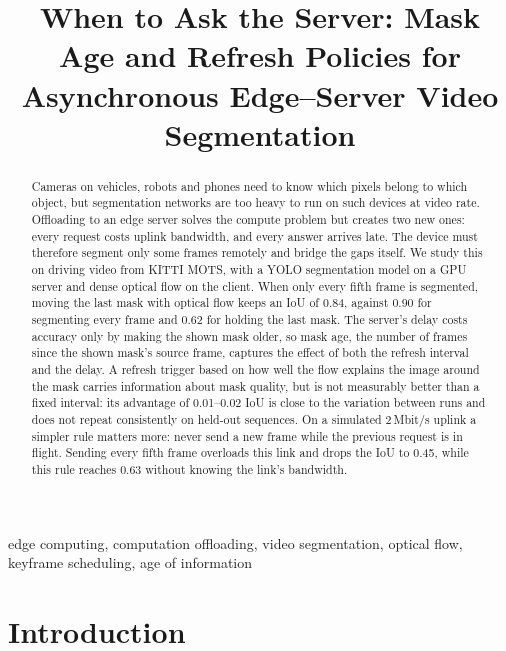 \documentclass[conference]{IEEEtran}
\newcommand{\todo}[1]{\textcolor{red}{[TODO: #1]}}
\begin{document}
\title{When to Ask the Server: Mask Age and Refresh Policies for Asynchronous Edge--Server Video Segmentation}

\author{
\IEEEauthorblockA{\todo{institute, university}\\
\todo{city, country}\\
\todo{e-mail}}}

\maketitle

\begin{abstract}
Cameras on vehicles, robots and phones need to know which pixels belong to which object, but segmentation networks are too heavy to run on such devices at video rate. Offloading to an edge server solves the compute problem but creates two new ones: every request costs uplink bandwidth, and every answer arrives late. The device must therefore segment only some frames remotely and bridge the gaps itself. We study this on driving video from KITTI MOTS, with a YOLO segmentation model on a GPU server and dense optical flow on the client. When only every fifth frame is segmented, moving the last mask with optical flow keeps an IoU of 0.84, against 0.90 for segmenting every frame and 0.62 for holding the last mask. The server's delay costs accuracy only by making the shown mask older, so mask age, the number of frames since the shown mask's source frame, captures the effect of both the refresh interval and the delay. A refresh trigger based on how well the flow explains the image around the mask carries information about mask quality, but is not measurably better than a fixed interval: its advantage of 0.01–0.02 IoU is close to the variation between runs and does not repeat consistently on held-out sequences. On a simulated 2\,Mbit/s uplink a simpler rule matters more: never send a new frame while the previous request is in flight. Sending every fifth frame overloads this link and drops the IoU to 0.45, while this rule reaches 0.63 without knowing the link's bandwidth.
\end{abstract}

\begin{IEEEkeywords}
edge computing, computation offloading, video segmentation, optical flow, keyframe scheduling, age of information
\end{IEEEkeywords}

\section{Introduction}
\end{document}

